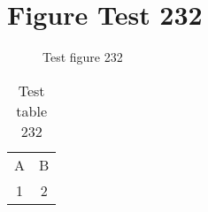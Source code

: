 \documentclass{article}
\begin{document}
\section{Figure Test 232}
\begin{figure}[h]
\caption{Test figure 232}
\end{figure}
\begin{table}[h]
\caption{Test table 232}
\begin{tabular}{cc}
A & B \\
1 & 2
\end{tabular}
\end{table}
\end{document}
